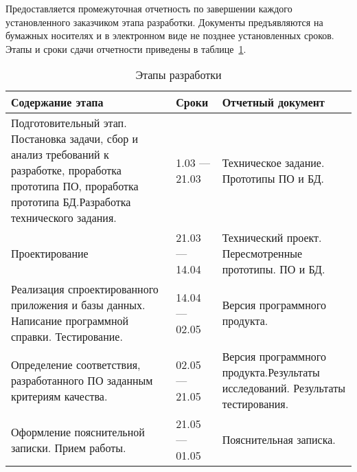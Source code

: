 Предоставляется промежуточная отчетность по завершении каждого установленного заказчиком этапа разработки. 
Документы предъявляются на бумажных носителях и в электронном виде не позднее установленных сроков. Этапы и сроки сдачи отчетности приведены в таблице~\ref{tab_1:tab_1}.

\begin{table}[ht]
\caption{Этапы разработки}
\label{tab_1:tab_1}
\begin{center}
\begin{tabularx}{\linewidth}{|X|X|X|}
\hline
Содержание этапа & Сроки & Отчетный документ \\
\hline
Подготовительный этап. Постановка задачи, сбор и анализ требований к разработке, проработка прототипа ПО, проработка прототипа БД.Разработка технического задания. & 1.03 --- 21.03 & Техническое задание. Прототипы ПО и БД. \\
\hline
Проектирование & 21.03 --- 14.04 & Технический проект. Пересмотренные прототипы. ПО и БД.  \\
\hline
Реализация спроектированного приложения и базы данных. Написание программной справки. Тестирование. & 14.04 --- 02.05 & Версия программного продукта. \\
\hline
Определение соответствия, разработанного ПО заданным критериям качества. & 02.05 --- 21.05 & Версия программного продукта.Результаты исследований. Результаты тестирования.\\
\hline
Оформление пояснительной записки. Прием работы. & 21.05 --- 01.05 & Пояснительная записка. \\
\hline
\end{tabularx}
\end{center}
\end{table}


